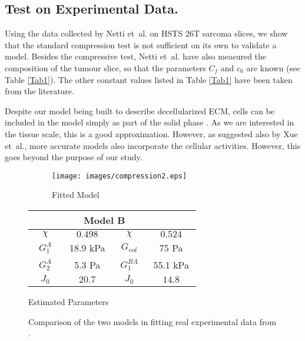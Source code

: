 \subsection{Test on Experimental Data.}
\label{data}
Using the data collected by Netti et~al. \cite{Netti} on HSTS 26T sarcoma slices, we show that the standard compression test is not sufficient on its own to validate a model. Besides the compressive test, Netti et~al. have also measured the composition of the tumour slice, so that the parameters $C_f$ and $c_0$ are known (see Table \ref{Tab1}). The other constant values listed in Table \ref{Tab1} have been taken from the literature. 

Despite our model being built to describe decellularized ECM, cells can be included in the model simply as part of the solid phase \cite{ecm2}. As we are interested in the tissue scale, this is a good approximation. However, as suggested also by Xue et~al.\cite{ecm2}, more accurate models also incorporate the cellular activities. However, this goes beyond the purpose of our study. 

\begin{figure}[h]
	\hspace{-8mm}
	\begin{subfigure}{0.62\textwidth}
		\hspace{2mm}
		\texttt{[image: images/compression2.eps]}
		\caption{Fitted Model}
		\label{fit}
	\end{subfigure}
	\begin{subtable}{0.375\textwidth}
			\begin{tabular}{c | c ||c| c }		
				\hline\addlinespace[2pt]
				 \multicolumn{2}{c||}{Model A} &  \multicolumn{2}{c}{Model B}\\[0.5mm]
				\hline\addlinespace[2pt]
				$\quad \chi\quad$ & $\quad0.498\quad$ &$\quad \chi\quad$&$\quad0.524\quad$\\[0.5mm]
				$G^A_1$ & 18.9 kPa&$G_{vol}$&75 Pa\\[0.5mm]
				$G^A_2$ & 5.3 Pa&$G^{BA}_{1}$& 55.1 kPa\\[0.5mm]
				$J_0$ & $20.7$&  $J_0$&$14.8$\\[0.5mm]
				\hline
			\end{tabular}
		\caption{Estimated Parameters}
		\label{param}
	\end{subtable}
\caption{Comparison of the two models in fitting real experimental data from \cite{Netti}.}		
\end{figure}

